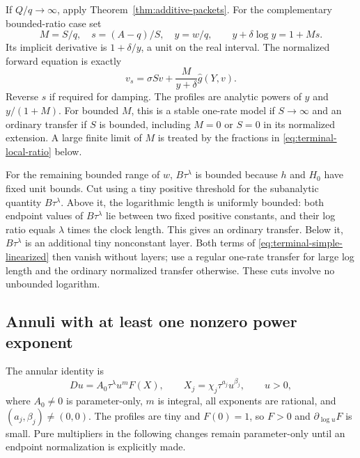 If \(Q/q\to\infty\), apply Theorem~\ref{thm:additive-packets}.
For the complementary bounded-ratio case set
\begin{equation}\label{eq:terminal-bounded-action}
 M=S/q,\quad s=(A-q)/S,\quad y=w/q,
 \qquad y+\delta\log y=1+Ms.
\end{equation}
Its implicit derivative is \(1+\delta/y\), a unit on the real interval.
The normalized forward equation is exactly
\begin{equation}\label{eq:terminal-bounded-a}
 v_s=\sigma S v+\frac{M}{y+\delta}\widehat g(Y,v).
\end{equation}
Reverse \(s\) if required for damping.  The profiles are analytic powers
of \(y\) and \(y/(1+M)\).  For bounded \(M\), this is a stable one-rate
model if \(S\to\infty\) and an ordinary transfer if \(S\) is bounded,
including \(M=0\) or \(S=0\) in its normalized extension.  A large finite
limit of \(M\) is treated by the fractions in
\eqref{eq:terminal-local-ratio} below.

For the remaining bounded range of \(w\), \(B\tau^\lambda\) is bounded
because \(h\) and \(H_0\) have fixed unit bounds.  Cut using a tiny
positive threshold for the subanalytic quantity \(B\tau^\lambda\).
Above it, the logarithmic length is uniformly bounded: both endpoint values
of \(B\tau^\lambda\) lie between two fixed positive constants, and their
log ratio equals \(\lambda\) times the clock length.  This gives an
ordinary transfer.  Below it, \(B\tau^\lambda\) is an additional tiny
nonconstant layer.  Both terms of
\eqref{eq:terminal-simple-linearized} then vanish without layers; use a
regular one-rate transfer for large log length and the ordinary normalized
transfer otherwise.  These cuts involve no unbounded logarithm.

\subsection{Annuli with at least one nonzero power exponent}

The annular identity is
\begin{equation}\label{eq:terminal-annulus}
 Du=A_0\tau^\lambda u^m F(X),\qquad
 X_j=\chi_j\tau^{a_j}u^{\beta_j},\qquad u>0,
\end{equation}
where \(A_0\ne0\) is parameter-only, \(m\) is integral, all exponents
are rational, and \((a_j,\beta_j)\ne(0,0)\).
The profiles are tiny and \(F(0)=1\), so \(F>0\) and
\(\partial_{\log u}F\) is small.  Pure multipliers in the following
changes remain parameter-only until an endpoint normalization is explicitly
made.

